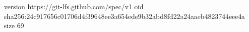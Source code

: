 version https://git-lfs.github.com/spec/v1
oid sha256:24c917656c01706d4f39648ee3a654ede9b32abd8fd22a24aaeb4823744eee4a
size 69
